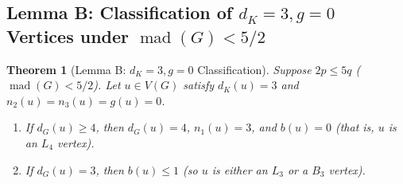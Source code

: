 \documentclass[11pt,a4paper]{article}
\newtheorem{theorem}{Theorem}[section]
\theoremstyle{definition}
\newcommand{\mad}{\operatorname{mad}}
\begin{document}
\subsection{Lemma B: Classification of \texorpdfstring{$d_K = 3, g = 0$}{d\_K=3, g=0} Vertices under \texorpdfstring{$\mad(G) < 5/2$}{mad(G) < 5/2}}

\begin{theorem}[Lemma B: $d_K = 3, g = 0$ Classification]\label{thm:core3}
Suppose $2p \le 5q$ ($\mad(G) < 5/2$). Let $u \in V(G)$ satisfy $d_K(u) = 3$ and $n_2(u) = n_3(u) = g(u) = 0$.
\begin{enumerate}[label=(\roman*),leftmargin=*,itemsep=2pt]
  \item If $d_G(u) \ge 4$, then $d_G(u) = 4$, $n_1(u) = 3$, and $b(u) = 0$ (that is, $u$ is an $L_4$ vertex).
  \item If $d_G(u) = 3$, then $b(u) \le 1$ (so $u$ is either an $L_3$ or a $B_3$ vertex).
\end{enumerate}
\end{theorem}
\end{document}

